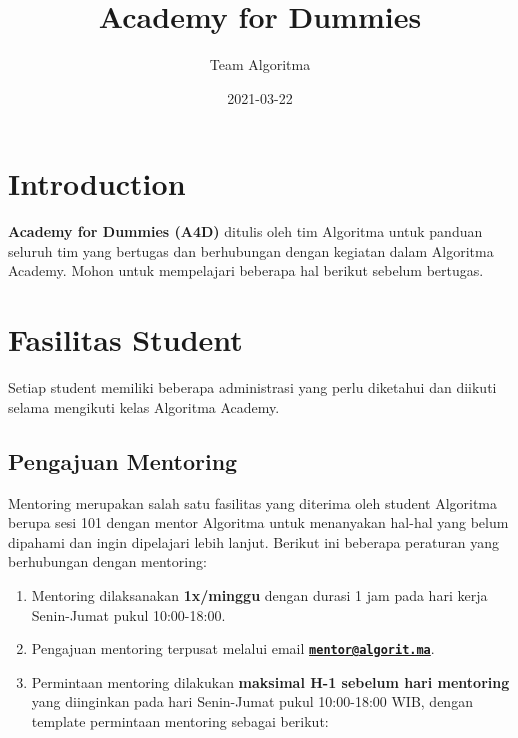 \documentclass[
]{book}
\title{Academy for Dummies}
\author{Team Algoritma}
\date{2021-03-22}
\providecommand{\tightlist}{%
  \setlength{\itemsep}{0pt}\setlength{\parskip}{0pt}}
\begin{document}
\maketitle

{
\setcounter{tocdepth}{1}
\tableofcontents
}
\hypertarget{introduction}{%
\chapter{Introduction}\label{introduction}}

\textbf{Academy for Dummies (A4D)} ditulis oleh tim Algoritma untuk panduan seluruh tim yang bertugas dan berhubungan dengan kegiatan dalam Algoritma Academy. Mohon untuk mempelajari beberapa hal berikut sebelum bertugas.

\hypertarget{fasilitas-student}{%
\chapter{Fasilitas Student}\label{fasilitas-student}}

Setiap student memiliki beberapa administrasi yang perlu diketahui dan diikuti selama mengikuti kelas Algoritma Academy.

\hypertarget{pengajuan-mentoring}{%
\section{Pengajuan Mentoring}\label{pengajuan-mentoring}}

Mentoring merupakan salah satu fasilitas yang diterima oleh student Algoritma berupa sesi 101 dengan mentor Algoritma untuk menanyakan hal-hal yang belum dipahami dan ingin dipelajari lebih lanjut. Berikut ini beberapa peraturan yang berhubungan dengan mentoring:

\begin{enumerate}
\def\labelenumi{\arabic{enumi}.}
\tightlist
\item
  Mentoring dilaksanakan \textbf{1x/minggu} dengan durasi 1 jam pada hari kerja Senin-Jumat pukul 10:00-18:00.
\item
  Pengajuan mentoring terpusat melalui email \textbf{\href{mailto:mentor@algorit.ma}{\nolinkurl{mentor@algorit.ma}}}.
\item
  Permintaan mentoring dilakukan \textbf{maksimal H-1 sebelum hari mentoring} yang diinginkan pada hari Senin-Jumat pukul 10:00-18:00 WIB, dengan template permintaan mentoring sebagai berikut:
\end{enumerate}
\end{document}
